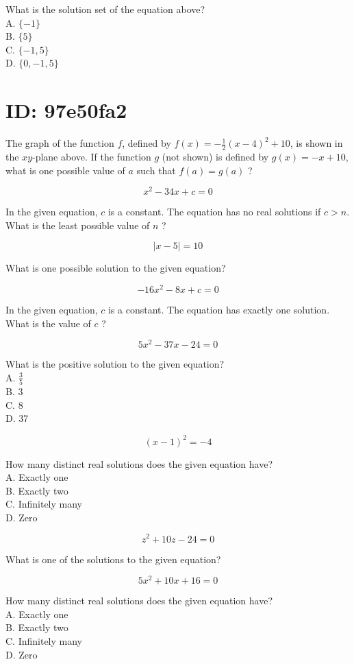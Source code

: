 What is the solution set of the equation above?\\
A. $\{-1\}$\\
B. $\{5\}$\\
C. $\{-1,5\}$\\
D. $\{0,-1,5\}$

\section*{ID: 97e50fa2}


The graph of the function $f$, defined by $f(x)=-\frac{1}{2}(x-4)^{2}+10$, is shown in the $x y$-plane above. If the function $g$ (not shown) is defined by $g(x)=-x+10$, what is one possible value of $a$ such that $f(a)=g(a)$ ?

$$
x^{2}-34 x+c=0
$$

In the given equation, $c$ is a constant. The equation has no real solutions if $c>n$. What is the least possible value of $n$ ?

$$
|x-5|=10
$$

What is one possible solution to the given equation?

$$
-16 x^{2}-8 x+c=0
$$

In the given equation, $c$ is a constant. The equation has exactly one solution. What is the value of $c$ ?

$$
5 x^{2}-37 x-24=0
$$

What is the positive solution to the given equation?\\
A. $\frac{3}{5}$\\
B. 3\\
C. 8\\
D. 37

$$
(x-1)^{2}=-4
$$

How many distinct real solutions does the given equation have?\\
A. Exactly one\\
B. Exactly two\\
C. Infinitely many\\
D. Zero

$$
z^{2}+10 z-24=0
$$

What is one of the solutions to the given equation?

$$
5 x^{2}+10 x+16=0
$$

How many distinct real solutions does the given equation have?\\
A. Exactly one\\
B. Exactly two\\
C. Infinitely many\\
D. Zero

